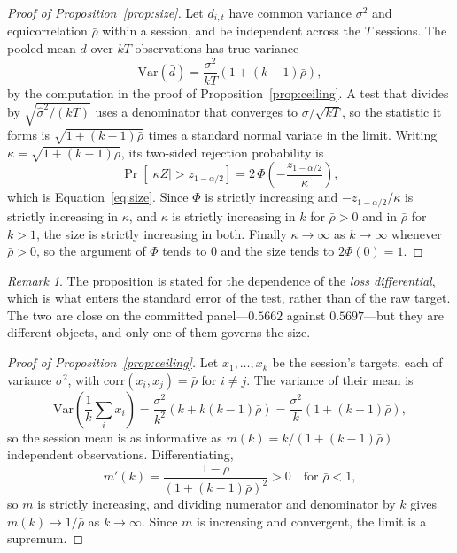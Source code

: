 \documentclass{article}
\theoremstyle{plain}
\theoremstyle{remark}
\newtheorem{remark}{Remark}
\begin{document}
\begin{proof}[Proof of Proposition~\ref{prop:size}]
Let $d_{i,t}$ have common variance $\sigma^2$ and equicorrelation $\bar\rho$
within a session, and be independent across the $T$ sessions. The pooled mean
$\bar d$ over $kT$ observations has true variance
\begin{equation}
\mathrm{Var}(\bar d) = \frac{\sigma^2}{kT}\left(1 + (k-1)\bar\rho\right),
\end{equation}
by the computation in the proof of Proposition~\ref{prop:ceiling}. A test that
divides by $\sqrt{\hat\sigma^2/(kT)}$ uses a denominator that converges to
$\sigma/\sqrt{kT}$, so the statistic it forms is
$\sqrt{1+(k-1)\bar\rho}$ times a standard normal variate in the limit. Writing
$\kappa = \sqrt{1+(k-1)\bar\rho}$, its two-sided rejection probability is
\begin{equation}
\Pr\left[\left|\kappa Z\right| > z_{1-\alpha/2}\right]
= 2\,\Phi\!\left(-\frac{z_{1-\alpha/2}}{\kappa}\right),
\end{equation}
which is Equation~\ref{eq:size}. Since $\Phi$ is strictly increasing and
$-z_{1-\alpha/2}/\kappa$ is strictly increasing in $\kappa$, and $\kappa$ is
strictly increasing in $k$ for $\bar\rho>0$ and in $\bar\rho$ for $k>1$, the
size is strictly increasing in both. Finally $\kappa\to\infty$ as $k\to\infty$
whenever $\bar\rho>0$, so the argument of $\Phi$ tends to $0$ and the size tends
to $2\Phi(0)=1$. \end{proof}

\begin{remark}
The proposition is stated for the dependence of the \emph{loss differential},
which is what enters the standard error of the test, rather than of the raw
target. The two are close on the committed panel---$0.5662$ against
$0.5697$---but they are different objects, and only one of them governs the
size.
\end{remark}

\begin{proof}[Proof of Proposition~\ref{prop:ceiling}]
Let $x_1,\dots,x_k$ be the session's targets, each of variance $\sigma^2$, with
$\mathrm{corr}(x_i,x_j) = \bar\rho$ for $i \ne j$. The variance of their mean is
\begin{equation}
\mathrm{Var}\!\left(\frac{1}{k}\sum_i x_i\right)
= \frac{\sigma^2}{k^2}\left(k + k(k-1)\bar\rho\right)
= \frac{\sigma^2}{k}\left(1 + (k-1)\bar\rho\right),
\end{equation}
so the session mean is as informative as $m(k) = k / (1 + (k-1)\bar\rho)$
independent observations. Differentiating,
\begin{equation}
m'(k) = \frac{1 - \bar\rho}{\left(1 + (k-1)\bar\rho\right)^2} > 0
\quad\text{for } \bar\rho < 1,
\end{equation}
so $m$ is strictly increasing, and dividing numerator and denominator by $k$
gives $m(k) \to 1/\bar\rho$ as $k \to \infty$. Since $m$ is increasing and
convergent, the limit is a supremum. \end{proof}
\end{document}

